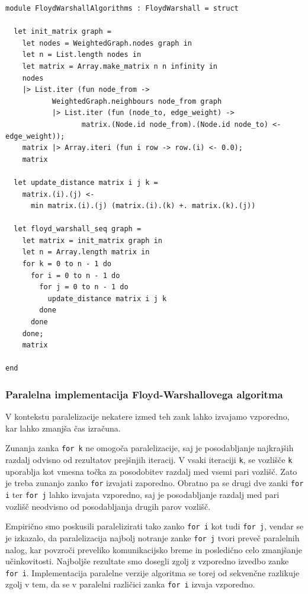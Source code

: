 \documentclass[mat1, tisk]{fmfdelo}
\begin{document}
\begin{lstlisting}[label=lst:floyd_warshall_seq]
module FloydWarshallAlgorithms : FloydWarshall = struct

  let init_matrix graph =
    let nodes = WeightedGraph.nodes graph in
    let n = List.length nodes in
    let matrix = Array.make_matrix n n infinity in
    nodes
    |> List.iter (fun node_from ->
           WeightedGraph.neighbours node_from graph
           |> List.iter (fun (node_to, edge_weight) ->
                  matrix.(Node.id node_from).(Node.id node_to) <- edge_weight));
    matrix |> Array.iteri (fun i row -> row.(i) <- 0.0);
    matrix
  
  let update_distance matrix i j k =
    matrix.(i).(j) <- 
      min matrix.(i).(j) (matrix.(i).(k) +. matrix.(k).(j))

  let floyd_warshall_seq graph =
    let matrix = init_matrix graph in
    let n = Array.length matrix in
    for k = 0 to n - 1 do
      for i = 0 to n - 1 do
        for j = 0 to n - 1 do
          update_distance matrix i j k
        done
      done
    done;
    matrix

end
\end{lstlisting}


\subsubsection{Paralelna implementacija Floyd-Warshallovega algoritma}

V kontekstu paralelizacije nekatere izmed teh zank lahko izvajamo vzporedno, kar lahko zmanjša čas izračuna.

Zunanja zanka \texttt{for k} ne omogoča paralelizacije, saj je posodabljanje najkrajših razdalj odvisno od rezultatov
prejšnjih iteracij. V vsaki iteraciji \texttt{k}, se vozlišče \texttt{k} uporablja kot vmesna točka za posodobitev
razdalj med vsemi pari vozlišč. Zato je treba zunanjo zanko \texttt{for} izvajati zaporedno.
Obratno pa se drugi dve zanki \texttt{for i} ter \texttt{for j} lahko izvajata vzporedno, saj je posodabljanje razdalj med pari vozlišč
neodvisno od posodabljanja drugih parov vozlišč.

Empirično smo poskusili paralelizirati tako zanko \texttt{for i} kot tudi \texttt{for j}, vendar se je izkazalo, da paralelizacija najbolj
notranje zanke \texttt{for j} tvori preveč paralelnih nalog, kar povzroči preveliko komunikacijsko breme in posledično
celo zmanjšanje učinkovitosti. Najboljše rezultate smo dosegli zgolj z vzporedno izvedbo zanke \texttt{for i}.
Implementacija paralelne verzije algoritma se torej od sekvenčne razlikuje zgolj v tem, da se v paralelni različici
zanka \texttt{for i} izvaja vzporedno.
\end{document}
